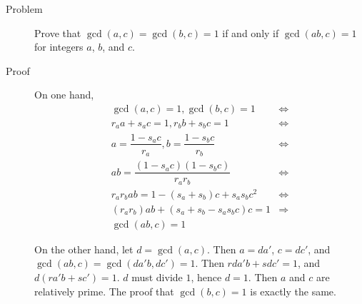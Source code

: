 \begin{description}
\item[Problem] Prove that $\gcd(a,c) = \gcd(b,c) = 1$ if and only if $\gcd(ab,
c) = 1$ for integers $a$, $b$, and $c$.

\item[Proof] On one hand,
\begin{align*}
\gcd(a, c) = 1, \gcd(b, c) = 1 &\iff \\
r_a a + s_a c = 1, r_b b + s_b c = 1 &\iff \\
a = \dfrac{1 - s_a c} {r_a}, b = \dfrac{1 - s_b c} {r_b} &\iff \\
ab = \dfrac{(1 - s_a c) (1 - s_b c)} {r_a r_b} &\iff \\
r_a r_b a b = 1 - (s_a + s_b) c + s_a s_b c^2 &\iff \\
(r_a r_b) a b + (s_a + s_b - s_a s_b c) c = 1 &\Rightarrow \\
\gcd(ab, c) = 1
\end{align*}

On the other hand, let $d = \gcd(a, c)$. Then $a = da'$, $c = dc'$, and
$\gcd(ab, c) = \gcd(da'b, dc') = 1$. Then $r da'b + s d c' = 1$, and $d(r a' b
+ s c') = 1$. $d$ must divide $1$, hence $d = 1$. Then $a$ and $c$ are
relatively prime. The proof that $\gcd(b, c) = 1$ is exactly the same.

\end{description}
